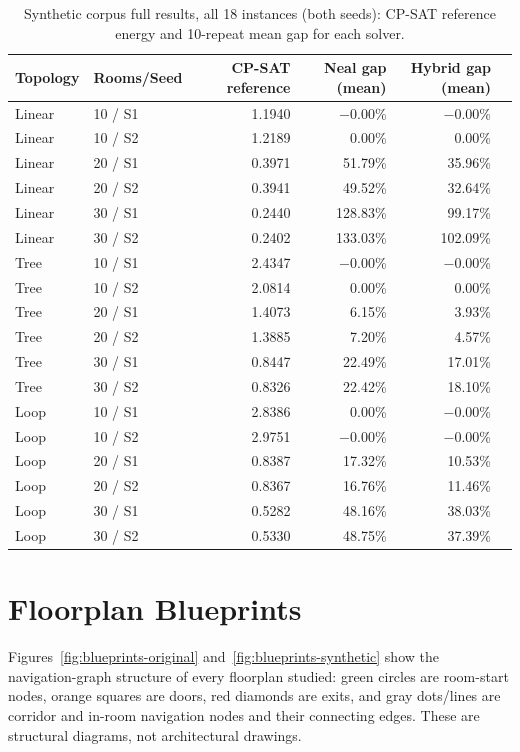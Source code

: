 \documentclass[11pt]{article}
\begin{document}
\begin{table}[h]
\centering
\caption{Synthetic corpus full results, all 18 instances (both seeds): CP-SAT reference energy and 10-repeat mean gap for each solver.}
\label{tab:appendixb2}
\small
\begin{tabular}{llrrrr}
\toprule
Topology & Rooms/Seed & CP-SAT reference & Neal gap (mean) & Hybrid gap (mean) \\
\midrule
Linear & 10 / S1 & 1.1940 & $-$0.00\% & $-$0.00\% \\
Linear & 10 / S2 & 1.2189 & 0.00\% & 0.00\% \\
Linear & 20 / S1 & 0.3971 & 51.79\% & 35.96\% \\
Linear & 20 / S2 & 0.3941 & 49.52\% & 32.64\% \\
Linear & 30 / S1 & 0.2440 & 128.83\% & 99.17\% \\
Linear & 30 / S2 & 0.2402 & 133.03\% & 102.09\% \\
Tree & 10 / S1 & 2.4347 & $-$0.00\% & $-$0.00\% \\
Tree & 10 / S2 & 2.0814 & 0.00\% & 0.00\% \\
Tree & 20 / S1 & 1.4073 & 6.15\% & 3.93\% \\
Tree & 20 / S2 & 1.3885 & 7.20\% & 4.57\% \\
Tree & 30 / S1 & 0.8447 & 22.49\% & 17.01\% \\
Tree & 30 / S2 & 0.8326 & 22.42\% & 18.10\% \\
Loop & 10 / S1 & 2.8386 & 0.00\% & $-$0.00\% \\
Loop & 10 / S2 & 2.9751 & $-$0.00\% & $-$0.00\% \\
Loop & 20 / S1 & 0.8387 & 17.32\% & 10.53\% \\
Loop & 20 / S2 & 0.8367 & 16.76\% & 11.46\% \\
Loop & 30 / S1 & 0.5282 & 48.16\% & 38.03\% \\
Loop & 30 / S2 & 0.5330 & 48.75\% & 37.39\% \\
\bottomrule
\end{tabular}
\end{table}

\section{Floorplan Blueprints}
\label{sec:appendixD}
Figures~\ref{fig:blueprints-original} and~\ref{fig:blueprints-synthetic} show the navigation-graph structure of every floorplan studied: green circles are room-start nodes, orange squares are doors, red diamonds are exits, and gray dots/lines are corridor and in-room navigation nodes and their connecting edges. These are structural diagrams, not architectural drawings.
\end{document}
